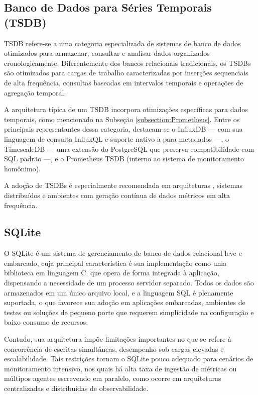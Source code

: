 \subsection{Banco de Dados para Séries Temporais (TSDB)}
\label{subsection:TSDB}

TSDB \citep{tigerdata2024} refere-se a uma categoria especializada de sistemas de banco de dados otimizados para armazenar, consultar e analisar dados organizados cronologicamente. Diferentemente dos bancos relacionais tradicionais, os TSDBs são otimizados para cargas de trabalho caracterizadas por inserções sequenciais de alta frequência, consultas baseadas em intervalos temporais e operações de agregação temporal.

A arquitetura típica de um TSDB incorpora otimizações específicas para dados temporais, como mencionado na Subseção \ref{subsection:Prometheus}. Entre os principais representantes dessa categoria, destacam-se o InfluxDB --- com sua linguagem de consulta InfluxQL e suporte nativo a  para metadados ---, o TimescaleDB --- uma extensão do PostgreSQL que preserva compatibilidade com SQL padrão ---, e o Prometheus TSDB (interno ao sistema de monitoramento homônimo).

A adoção de TSDBs é especialmente recomendada em arquiteturas , sistemas distribuídos e ambientes com geração contínua de dados métricos em alta frequência.

\subsection{SQLite}
\label{subsection:SQLite}

O SQLite \citep{sqlite2025} é um sistema de gerenciamento de banco de dados relacional leve e embarcado, cuja principal característica é sua implementação como uma biblioteca em linguagem C, que opera de forma integrada à aplicação, dispensando a necessidade de um processo servidor separado. Todos os dados são armazenados em um único arquivo local, e a linguagem SQL é plenamente suportada, o que favorece sua adoção em aplicações embarcadas, ambientes de testes ou soluções de pequeno porte que requerem simplicidade na configuração e baixo consumo de recursos.

Contudo, sua arquitetura impõe limitações importantes no que se refere à concorrência de escritas simultâneas, desempenho sob cargas elevadas e escalabilidade. Tais restrições tornam o SQLite pouco adequado para cenários de monitoramento intensivo, nos quais há alta taxa de ingestão de métricas ou múltipos agentes escrevendo em paralelo, como ocorre em arquiteturas centralizadas e distribuídas de observabilidade.

